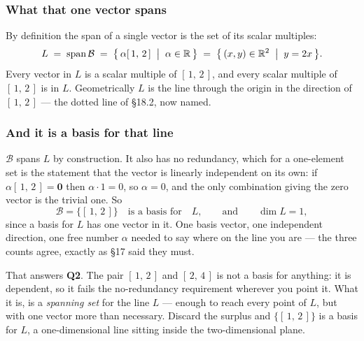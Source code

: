 \documentclass[11pt]{article}
\theoremstyle{definition}
\theoremstyle{remark}
\newcommand{\R}{\mathbb{R}}
\newcommand{\vc}[1]{\mathbf{#1}}
\newcommand{\bas}{\mathcal{B}}
\DeclareMathOperator{\spanop}{span}   %
\newcommand{\lattice}[4]{%
  \draw[step=1cm,gray!25,very thin] (#1,#3) grid (#2,#4);
  \draw[axisline] (#1,0) -- (#2+0.45,0) node[right,font=\scriptsize,black]{$x$};
  \draw[axisline] (0,#3) -- (0,#4+0.45) node[above,font=\scriptsize,black]{$y$};
}
\begin{document}
\subsubsection*{What that one vector spans}
By definition the span of a single vector is the set of its scalar multiples:
\[
  L \;=\; \spanop\bas
    \;=\; \bigl\{\, \alpha[\,1,\,2\,] \;\bigm|\; \alpha\in\R \,\bigr\}
    \;=\; \bigl\{\,(x,y)\in\R^{2} \;\bigm|\; y=2x \,\bigr\} .
\]
Every vector in $L$ is a scalar multiple of $[\,1,\,2\,]$, and every scalar
multiple of $[\,1,\,2\,]$ is in $L$. Geometrically $L$ is the line through the
origin in the direction of $[\,1,\,2\,]$ --- the dotted line of \S18.2, now
named.

\begin{center}
\end{center}

\subsubsection*{And it is a basis for that line}
$\bas$ spans $L$ by construction. It also has no redundancy, which for a
one-element set is the statement that the vector is linearly independent on its
own: if $\alpha[\,1,\,2\,]=\vc{0}$ then $\alpha\cdot1=0$, so $\alpha=0$, and the
only combination giving the zero vector is the trivial one. So
\[
  \bas=\bigl\{[\,1,\,2\,]\bigr\}
  \quad\text{is a basis for}\quad L ,
  \qquad\text{and}\qquad
  \dim L = 1 ,
\]
since a basis for $L$ has one vector in it. One basis vector, one independent
direction, one free number $\alpha$ needed to say where on the line you are ---
the three counts agree, exactly as \S17 said they must.

\smallskip
\noindent That answers \textbf{Q2}. The pair $[\,1,\,2\,]$ and $[\,2,\,4\,]$ is
not a basis for anything: it is dependent, so it fails the no-redundancy
requirement wherever you point it. What it is, is a \emph{spanning set} for the
line $L$ --- enough to reach every point of $L$, but with one vector more than
necessary. Discard the surplus and $\{[\,1,\,2\,]\}$ is a basis for $L$, a
one-dimensional line sitting inside the two-dimensional plane.
\end{document}
